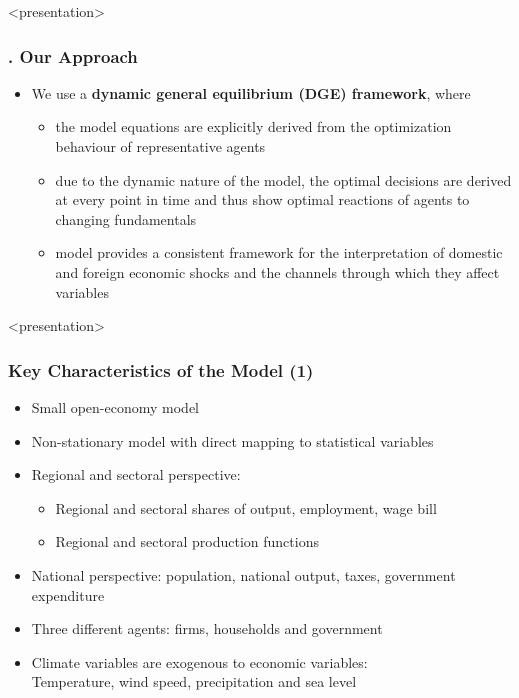 \documentclass[11pt,aspectratio=169]{beamer}
\begin{document}
\begin{frame}<presentation>
	\frametitle{{\thesection.\thesubsection} Our Approach}
	\begin{itemize}	
	\item We use a \textbf{dynamic general equilibrium (DGE) framework}, where 
	\begin{itemize}
		\item the model equations are explicitly derived from the optimization behaviour of representative agents
		\item due to the dynamic nature of the model, the optimal decisions are derived at every point in time and thus show optimal reactions of agents to changing fundamentals
		\item model provides a consistent framework for the interpretation of domestic and foreign economic shocks and the channels through which they affect variables
	\end{itemize}		
	\end{itemize}
\end{frame}

\begin{frame}<presentation>
	\frametitle{Key Characteristics of the Model (1)}
	\begin{itemize}
		
	\item Small open-economy model
	\item Non-stationary model with direct mapping to statistical variables
	\item Regional and sectoral perspective:
	\begin{itemize}
	\item	Regional and sectoral shares of output, employment, wage bill
	\item	Regional and sectoral production functions
	\end{itemize}
	\item National perspective:	population, national output, taxes, government expenditure
	\item	Three different agents: firms, households and government
	\item	Climate variables are exogenous to economic variables:\\
	{\small{Temperature, wind speed, precipitation and sea level}}
		
	\end{itemize}
\end{frame}

   
   
\end{document}
